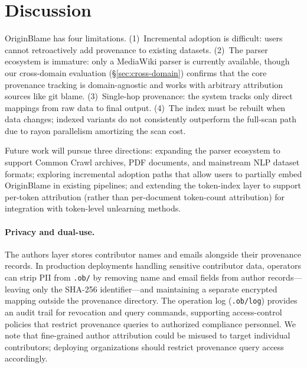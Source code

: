 \section{Discussion}
\label{sec:discussion}

OriginBlame has four limitations. (1)~Incremental adoption is difficult: users cannot retroactively add provenance to existing datasets. (2)~The parser ecosystem is immature: only a MediaWiki parser is currently available, though our cross-domain evaluation (\S\ref{sec:cross-domain}) confirms that the core provenance tracking is domain-agnostic and works with arbitrary attribution sources like git blame. (3)~Single-hop provenance: the system tracks only direct mappings from raw data to final output. (4)~The index must be rebuilt when data changes; indexed variants do not consistently outperform the full-scan path due to rayon parallelism amortizing the scan cost.

Future work will pursue three directions: expanding the parser ecosystem to support Common Crawl archives, PDF documents, and mainstream NLP dataset formats; exploring incremental adoption paths that allow users to partially embed OriginBlame in existing pipelines; and extending the token-index layer to support per-token attribution (rather than per-document token-count attribution) for integration with token-level unlearning methods.

\paragraph{Privacy and dual-use.}
The authors layer stores contributor names and emails alongside their provenance records. In production deployments handling sensitive contributor data, operators can strip PII from \texttt{.ob/} by removing name and email fields from author records---leaving only the SHA-256 identifier---and maintaining a separate encrypted mapping outside the provenance directory. The operation log (\texttt{.ob/log}) provides an audit trail for revocation and query commands, supporting access-control policies that restrict provenance queries to authorized compliance personnel. We note that fine-grained author attribution could be misused to target individual contributors; deploying organizations should restrict provenance query access accordingly.

